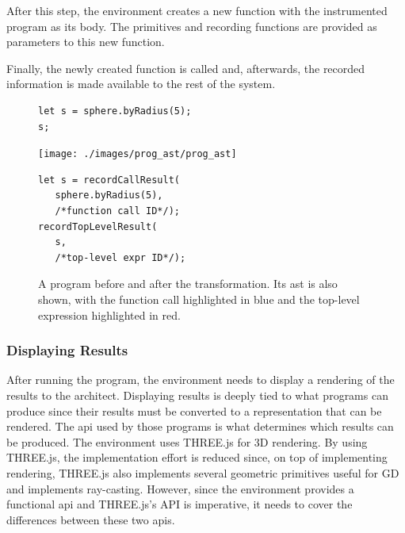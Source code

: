 After this step, the environment creates a new function with the instrumented program as its body.
The primitives and recording functions are provided as parameters to this new function.

Finally, the newly created function is called and, afterwards, the recorded information is made available to the rest of the system.

\begin{figure}
  \centering
\begin{minipage}[c]{0.3\linewidth}
  \begin{verbatim}
let s = sphere.byRadius(5);
s;
  \end{verbatim}
\end{minipage}%
\hspace{0.045\linewidth}%
\begin{minipage}[c]{0.3\linewidth}
  \texttt{[image: ./images/prog\_ast/prog\_ast]}
\end{minipage}%
\hspace{0.045\linewidth}%
\begin{minipage}[c]{0.3\linewidth}
  \begin{verbatim}
let s = recordCallResult(
   sphere.byRadius(5),
   /*function call ID*/);
recordTopLevelResult(
   s,
   /*top-level expr ID*/);
  \end{verbatim}
\end{minipage}
  \caption[A program before and after the transformation.]{A program before and after the transformation. Its \gls{ast} is also shown, with the function call highlighted in blue and the top-level expression highlighted in red.}
  \label{fig:instrument:example}
\end{figure}


\subsubsection{Displaying Results}
After running the program, the environment needs to display a rendering of the results to the architect.
Displaying results is deeply tied to what programs can produce since their results must be converted to a representation that can be rendered.
The \gls{api} used by those programs is what determines which results can be produced.
The environment uses THREE.js for 3D rendering.
By using THREE.js, the implementation effort is reduced since, on top of implementing rendering, THREE.js also implements several geometric primitives useful for GD and implements ray-casting.
However, since the environment provides a functional \gls{api} and THREE.js's API is imperative, it needs to cover the differences between these two \glspl{api}.

